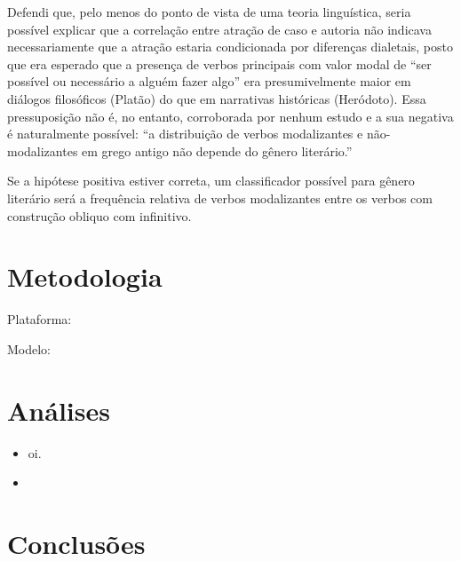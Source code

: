 \documentclass[article, 12pt]{memoir}
\begin{document}
Defendi que, pelo menos do ponto de vista de uma teoria linguística, seria possível explicar que a correlação entre atração de caso e autoria não indicava necessariamente que a atração estaria condicionada por diferenças dialetais, posto que era esperado que a presença de verbos principais com valor modal de ``ser possível ou necessário a alguém fazer algo'' era presumivelmente maior em diálogos filosóficos (Platão) do que em narrativas históricas (Heródoto).
Essa pressuposição não é, no entanto, corroborada por nenhum estudo e a sua negativa é naturalmente possível: ``a distribuição de verbos modalizantes e não-modalizantes em grego antigo não depende do gênero literário.''

Se a hipótese positiva estiver correta, um classificador possível para gênero literário será a frequência relativa de verbos modalizantes entre os verbos com construção obliquo com infinitivo.

\chapter{Metodologia}
Plataforma: \textcite{stanza}

Modelo: \textcite{AGLDT2011,AGLDT2014}

\chapter{Análises}

\begin{itemize}
  \item oi.
  \item
\end{itemize}

\chapter{Conclusões}

\printbibliography%
\end{document}

